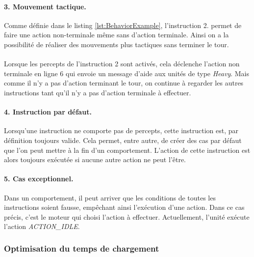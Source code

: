 \documentclass{report}
\begin{document}
\paragraph{3. Mouvement tactique.}
Comme définie dans le listing \ref{lst:BehaviorExample}, l'instruction 2. permet de faire une action non-terminale même sans d'action terminale.
Ainsi on a la possibilité de réaliser des mouvements plus tactiques sans terminer le tour.
\paragraph{}Lorsque les percepts de l'instruction 2 sont activés, cela déclenche l'action non terminale en ligne 6 qui envoie un message d'aide aux unités de type \textit{Heavy}. Mais comme il n'y a pas d'action terminant le tour, on continue à regarder les autres instructions tant qu'il n'y a pas d'action terminale à effectuer.

\paragraph{4. Instruction par défaut.}
Lorsqu'une instruction ne comporte pas de percepts, cette instruction est, par définition toujours valide. Cela permet, entre autre, de créer des cas par défaut que l'on peut mettre à la fin d'un comportement. L'action de cette instruction est alors toujours exécutée si aucune autre action ne peut l'être.

\paragraph{5. Cas exceptionnel.}
Dans un comportement, il peut arriver que les conditions de toutes les instructions soient fausse, empêchant ainsi l'exécution d'une action. Dans ce cas précis, c'est le moteur qui choisi l'action à effectuer. Actuellement, l'unité exécute l'action \textit{ACTION\_IDLE}.

\subsubsection{Optimisation du temps de chargement}
\end{document}
